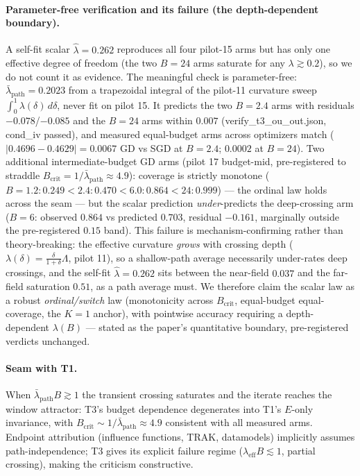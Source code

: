 \documentclass{article}
\newcommand{\Expo}{E}         %
\newcommand{\B}{B}            %
\newcommand{\lam}{\lambda}
\newcommand{\lameff}{\lam_{\mathrm{eff}}}
\newcommand{\lampath}{\bar{\lam}_{\mathrm{path}}}
\begin{document}
\paragraph{Parameter-free verification and its failure (the depth-dependent boundary).}
A self-fit scalar $\hat\lambda=0.262$ reproduces all four pilot-15 arms but has only one
effective degree of freedom (the two $\B=24$ arms saturate for any $\lambda\gtrsim0.2$), so we
do not count it as evidence. The meaningful check is parameter-free: $\lampath=0.2023$ from a
trapezoidal integral of the pilot-11 curvature sweep $\int_0^1\lambda(\delta)\,d\delta$, never
fit on pilot 15. It predicts the two $\B=2.4$ arms with residuals $-0.078$/$-0.085$ and the
$\B=24$ arms within $0.007$ (verify\_t3\_ou\_out.json, cond\_iv passed), and measured
equal-budget arms across optimizers match ($|0.4696-0.4629|=0.0067$ GD vs SGD at $\B=2.4$;
$0.0002$ at $\B=24$). Two additional intermediate-budget GD arms (pilot 17 budget-mid,
pre-registered to straddle $\B_{\mathrm{crit}}=1/\lampath\approx4.9$): coverage is strictly monotone
($\B=1.2: 0.249 < 2.4: 0.470 < 6.0: 0.864 < 24: 0.999$) --- the ordinal law holds across the
seam --- but the scalar prediction \emph{under}-predicts the deep-crossing arm
($\B=6$: observed $0.864$ vs predicted $0.703$, residual $-0.161$, marginally outside the
pre-registered $0.15$ band). This failure is mechanism-confirming rather than
theory-breaking: the effective curvature \emph{grows} with crossing depth
($\lambda(\delta)=\frac{\delta}{1+\delta}\Lambda$, pilot 11), so a shallow-path average
necessarily under-rates deep crossings, and the self-fit $\hat\lambda=0.262$ sits between the
near-field $0.037$ and the far-field saturation $0.51$, as a path average must. We therefore
claim the scalar law as a robust \emph{ordinal/switch} law (monotonicity across
$\B_{\mathrm{crit}}$, equal-budget equal-coverage, the $K{=}1$ anchor), with pointwise
accuracy requiring a depth-dependent $\lambda(\B)$ --- stated as the paper's quantitative
boundary, pre-registered verdicts unchanged.

\paragraph{Seam with T1.} When $\lampath\B\gtrsim1$ the transient crossing saturates and the
iterate reaches the window attractor: T3's budget dependence degenerates into T1's
$\Expo$-only invariance, with $\B_{\mathrm{crit}}\sim1/\lampath\approx4.9$ consistent with all
measured arms. Endpoint attribution (influence functions, TRAK, datamodels) implicitly
assumes path-independence; T3 gives its explicit failure regime
($\lameff\B\lesssim1$, partial crossing), making the criticism constructive.
\end{document}
